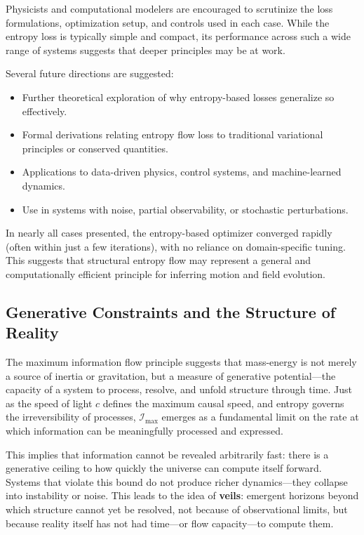 \documentclass[12pt]{article}
\begin{document}
Physicists and computational modelers are encouraged to scrutinize the loss formulations, optimization setup, and controls used in each case. While the entropy loss is typically simple and compact, its performance across such a wide range of systems suggests that deeper principles may be at work.

Several future directions are suggested:
\begin{itemize}
    \item Further theoretical exploration of why entropy-based losses generalize so effectively.
    \item Formal derivations relating entropy flow loss to traditional variational principles or conserved quantities.
    \item Applications to data-driven physics, control systems, and machine-learned dynamics.
    \item Use in systems with noise, partial observability, or stochastic perturbations.
\end{itemize}

In nearly all cases presented, the entropy-based optimizer converged rapidly (often within just a few iterations), with no reliance on domain-specific tuning. This suggests that structural entropy flow may represent a general and computationally efficient principle for inferring motion and field evolution.


\subsection{Generative Constraints and the Structure of Reality}

The maximum information flow principle suggests that mass-energy is not merely a source of inertia or gravitation, but a measure of generative potential—the capacity of a system to process, resolve, and unfold structure through time. Just as the speed of light \( c \) defines the maximum causal speed, and entropy governs the irreversibility of processes, \( \mathcal{I}_{\text{max}} \) emerges as a fundamental limit on the rate at which information can be meaningfully processed and expressed.

This implies that information cannot be revealed arbitrarily fast: there is a generative ceiling to how quickly the universe can compute itself forward. Systems that violate this bound do not produce richer dynamics—they collapse into instability or noise. This leads to the idea of \textbf{veils}: emergent horizons beyond which structure cannot yet be resolved, not because of observational limits, but because reality itself has not had time—or flow capacity—to compute them.
\end{document}
